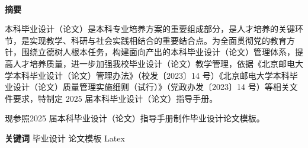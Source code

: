 \documentclass[../main.tex]{subfiles}
\begin{document}
\begin{titlepage}

    \pagestyle{empty}

    \begin{spacing}{1.05}
        \centering
        \parbox[c]{.75\textwidth}{
          \centering
          \heiti{}\textbf{\thesistitle}
        }
    \end{spacing}

    \begin{spacing}{1.5}
        \centering
        \quad{} \\ 
        \heiti{}\textbf{摘\quad{}要} \\ 
    \end{spacing}
    \quad{}

    \normalsize

    本科毕业设计（论文）是本科专业培养方案的重要组成部分，是人才培养的关键环节，是实现教学、科研与社会实践相结合的重要结合点。为全面贯彻党的教育方针，围绕立德树人根本任务，构建面向产出的本科毕业设计（论文）管理体系，提高人才培养质量，进一步加强我校毕业设计（论文）教学管理，依据《北京邮电大学本科毕业设计（论文）管理办法》（校发〔2023〕14 号）《北京邮电大学本科毕业设计（论文）质量管理实施细则（试行）》（党政办发〔2023〕14 号）等相关文件要求，特制定 2025 届本科毕业设计（论文）指导手册。

    现参照2025 届本科毕业设计（论文）指导手册制作毕业设计论文模板。

    \quad{}

    \par\noindent\heiti{}\textbf{关键词}\quad{}
    {
      \songti{}
      毕业设计\quad
      论文模板\quad
      Latex\quad
    } 
\end{titlepage}

\thispagestyle{empty}
\end{document}
